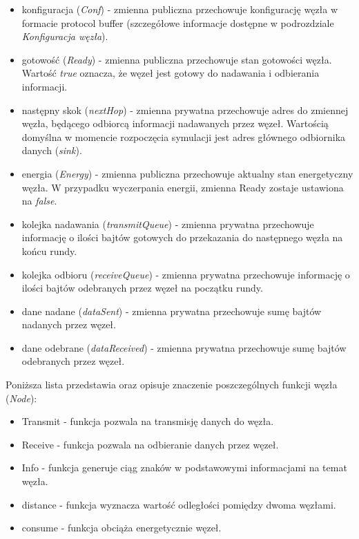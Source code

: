 \documentclass[a4paper,12pt,twoside,openany]{report}
\begin{document}
\begin{itemize}
 \item konfiguracja (\textit{Conf}) - zmienna publiczna przechowuje konfigurację węzła w formacie protocol buffer (szczegółowe informacje dostępne w podrozdziale \textit{Konfiguracja węzła}).
 \item gotowość (\textit{Ready}) - zmienna publiczna przechowuje stan gotowości węzła. Wartość \textit{true} oznacza, że węzeł jest gotowy do nadawania i odbierania informacji.
 \item następny skok (\textit{nextHop}) - zmienna prywatna przechowuje adres do zmiennej węzła, będącego odbiorcą informacji nadawanych przez węzeł. Wartością domyślna w momencie
       rozpoczęcia symulacji jest adres głównego odbiornika danych (\textit{sink}).
 \item energia (\textit{Energy}) - zmienna publiczna przechowuje aktualny stan energetyczny węzła. W przypadku wyczerpania energii, zmienna Ready zostaje ustawiona na \textit{false}.
 \item kolejka nadawania (\textit{transmitQueue}) - zmienna prywatna przechowuje informację o ilości bajtów gotowych do przekazania do następnego węzła na końcu rundy.
 \item kolejka odbioru (\textit{receiveQueue}) - zmienna prywatna przechowuje informację o ilości bajtów odebranych przez węzeł na początku rundy.
 \item dane nadane (\textit{dataSent}) - zmienna prywatna przechowuje sumę bajtów nadanych przez węzeł.
 \item dane odebrane (\textit{dataReceived}) - zmienna prywatna przechowuje sumę bajtów odebranych przez węzeł.
\end{itemize}

Poniższa lista przedstawia oraz opisuje znaczenie poszczególnych funkcji węzła (\textit{Node}):

\begin{itemize}
 \item Transmit - funkcja pozwala na transmisję danych do węzła.
 \item Receive - funkcja pozwala na odbieranie danych przez węzeł.
 \item Info - funkcja generuje ciąg znaków w podstawowymi informacjami na temat węzła.
 \item distance - funkcja wyznacza wartość odległości pomiędzy dwoma węzłami.
 \item consume - funkcja obciąża energetycznie węzeł.
\end{itemize}
\end{document}
